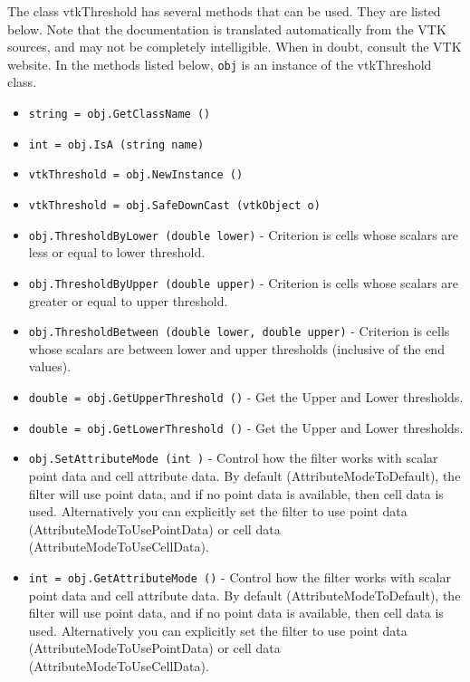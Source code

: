 The class vtkThreshold has several methods that can be used.
  They are listed below.
Note that the documentation is translated automatically from the VTK sources,
and may not be completely intelligible.  When in doubt, consult the VTK website.
In the methods listed below, \verb|obj| is an instance of the vtkThreshold class.
\begin{itemize}
\item  \verb|string = obj.GetClassName ()|

\item  \verb|int = obj.IsA (string name)|

\item  \verb|vtkThreshold = obj.NewInstance ()|

\item  \verb|vtkThreshold = obj.SafeDownCast (vtkObject o)|

\item  \verb|obj.ThresholdByLower (double lower)| -  Criterion is cells whose scalars are less or equal to lower threshold.

\item  \verb|obj.ThresholdByUpper (double upper)| -  Criterion is cells whose scalars are greater or equal to upper threshold.

\item  \verb|obj.ThresholdBetween (double lower, double upper)| -  Criterion is cells whose scalars are between lower and upper thresholds
 (inclusive of the end values).

\item  \verb|double = obj.GetUpperThreshold ()| -  Get the Upper and Lower thresholds.

\item  \verb|double = obj.GetLowerThreshold ()| -  Get the Upper and Lower thresholds.

\item  \verb|obj.SetAttributeMode (int )| -  Control how the filter works with scalar point data and cell attribute
 data.  By default (AttributeModeToDefault), the filter will use point
 data, and if no point data is available, then cell data is
 used. Alternatively you can explicitly set the filter to use point data
 (AttributeModeToUsePointData) or cell data (AttributeModeToUseCellData).

\item  \verb|int = obj.GetAttributeMode ()| -  Control how the filter works with scalar point data and cell attribute
 data.  By default (AttributeModeToDefault), the filter will use point
 data, and if no point data is available, then cell data is
 used. Alternatively you can explicitly set the filter to use point data
 (AttributeModeToUsePointData) or cell data (AttributeModeToUseCellData).


\end{itemize}
